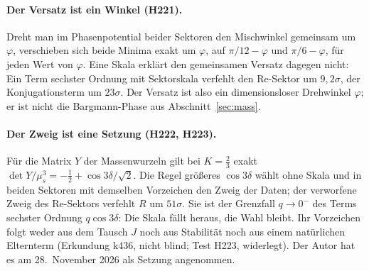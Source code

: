 \paragraph{Der Versatz ist ein Winkel (H221).}
Dreht man im Phasenpotential beider Sektoren den Mischwinkel gemeinsam um \(\varphi\), verschieben sich beide Minima exakt um \(\varphi\), auf
\(\pi/12-\varphi\) und \(\pi/6-\varphi\), für jeden Wert von \(\varphi\). Eine Skala erklärt den gemeinsamen Versatz dagegen nicht: Ein Term sechster
Ordnung mit Sektorskala verfehlt den Re-Sektor um \(9{,}2\sigma\), der Konjugationsterm um \(23\sigma\). Der Versatz ist also ein dimensionsloser
Drehwinkel \(\varphi\); er ist nicht die Bargmann-Phase aus Abschnitt~\ref{sec:mass}.

\paragraph{Der Zweig ist eine Setzung (H222, H223).}
Für die Matrix \(Y\) der Massenwurzeln gilt bei \(K=\tfrac23\) exakt \(\det Y/\mu_s^3=-\tfrac12+\cos3\delta/\sqrt2\). Die Regel \glqq größeres
\(\cos3\delta\)\grqq{} wählt ohne Skala und in beiden Sektoren mit demselben Vorzeichen den Zweig der Daten; der verworfene Zweig des Re-Sektors
verfehlt \(R\) um \(51\sigma\). Sie ist der Grenzfall \(q\to0^-\) des Terms sechster Ordnung \(q\cos3\delta\): Die Skala fällt heraus, die Wahl
bleibt. Ihr Vorzeichen folgt weder aus dem Tausch \(J\) noch aus Stabilität noch aus einem natürlichen Elternterm (Erkundung k436, nicht
blind; Test H223, widerlegt). Der Autor hat es am 28.~November 2026 als Setzung angenommen.

